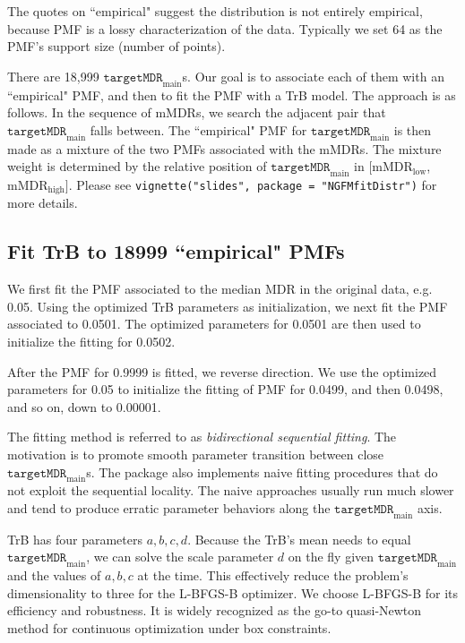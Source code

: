 \documentclass[12pt,letterpaper]{article}
\begin{document}
The quotes on ``empirical" suggest the distribution is not entirely empirical, because PMF is a lossy characterization of the data. Typically we set 64 as the PMF's support size (number of points).

There are 18,999 $\texttt{targetMDR}_{\text{main}}$s. Our goal is to associate each of them with an ``empirical" PMF, and then to fit the PMF with a TrB model. The approach is as follows. In the sequence of mMDRs, we search the adjacent pair that $\texttt{targetMDR}_{\text{main}}$ falls between. The ``empirical" PMF for $\texttt{targetMDR}_{\text{main}}$ is then made as a mixture of the two PMFs associated with the mMDRs. The mixture weight is determined by the relative position of $\texttt{targetMDR}_{\text{main}}$ in $[$mMDR$_{\text{low}}$, mMDR$_{\text{high}}]$. Please see \texttt{vignette("slides", package = "NGFMfitDistr")} for more details.

\subsection{Fit TrB to 18999 ``empirical" PMFs}\label{secfit}
We first fit the PMF associated to the median MDR in the original data, e.g. 0.05. Using the optimized TrB parameters as initialization, we next fit the PMF associated to 0.0501. The optimized parameters for 0.0501 are then used to initialize the fitting for 0.0502. 

After the PMF for 0.9999 is fitted, we reverse direction. We use the optimized parameters for 0.05 to initialize the fitting of PMF for 0.0499, and then 0.0498, and so on, down to 0.00001.

The fitting method is referred to as \textit{bidirectional sequential fitting}. The motivation is to promote smooth parameter transition between close $\texttt{targetMDR}_{\text{main}}$s. The package also implements naive fitting procedures that do not exploit the sequential locality. The naive approaches usually run much slower and tend to produce erratic parameter behaviors along the $\texttt{targetMDR}_{\text{main}}$ axis. 

TrB has four parameters $a, b, c, d$. Because the TrB's mean needs to equal $\texttt{targetMDR}_{\text{main}}$, we can solve the scale parameter $d$ on the fly given $\texttt{targetMDR}_{\text{main}}$ and the values of $a,b,c$ at the time. This effectively reduce the problem's dimensionality to three for the L-BFGS-B optimizer. We choose L-BFGS-B for its efficiency and robustness. It is widely recognized as the go-to quasi-Newton method for continuous optimization under box constraints.
\end{document}
